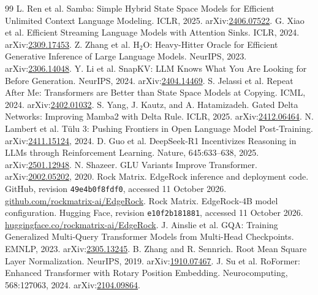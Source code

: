 \begin{thebibliography}{99}
 L. Ren et al. Samba: Simple Hybrid State Space Models for Efficient Unlimited Context Language Modeling. ICLR, 2025. arXiv:\href{https://arxiv.org/abs/2406.07522}{2406.07522}.
 G. Xiao et al. Efficient Streaming Language Models with Attention Sinks. ICLR, 2024. arXiv:\href{https://arxiv.org/abs/2309.17453}{2309.17453}.
 Z. Zhang et al. H$_2$O: Heavy-Hitter Oracle for Efficient Generative Inference of Large Language Models. NeurIPS, 2023. arXiv:\href{https://arxiv.org/abs/2306.14048}{2306.14048}.
 Y. Li et al. SnapKV: LLM Knows What You Are Looking for Before Generation. NeurIPS, 2024. arXiv:\href{https://arxiv.org/abs/2404.14469}{2404.14469}.
 S. Jelassi et al. Repeat After Me: Transformers are Better than State Space Models at Copying. ICML, 2024. arXiv:\href{https://arxiv.org/abs/2402.01032}{2402.01032}.
 S. Yang, J. Kautz, and A. Hatamizadeh. Gated Delta Networks: Improving Mamba2 with Delta Rule. ICLR, 2025. arXiv:\href{https://arxiv.org/abs/2412.06464}{2412.06464}.
 N. Lambert et al. T\"ulu 3: Pushing Frontiers in Open Language Model Post-Training. arXiv:\href{https://arxiv.org/abs/2411.15124}{2411.15124}, 2024.
 D. Guo et al. DeepSeek-R1 Incentivizes Reasoning in LLMs through Reinforcement Learning. Nature, 645:633--638, 2025. arXiv:\href{https://arxiv.org/abs/2501.12948}{2501.12948}.
 N. Shazeer. GLU Variants Improve Transformer. arXiv:\href{https://arxiv.org/abs/2002.05202}{2002.05202}, 2020.
 Rock Matrix. EdgeRock inference and deployment code. GitHub, revision \texttt{49e4b0f8fdf0}, accessed 11 October 2026. \href{https://github.com/rockmatrix-ai/EdgeRock/tree/49e4b0f8fdf0ff508f7570c6b3ef3eada3c8747a}{github.com/rockmatrix-ai/EdgeRock}.
 Rock Matrix. EdgeRock-4B model configuration. Hugging Face, revision \texttt{e10f2b181881}, accessed 11 October 2026. \href{https://huggingface.co/rockmatrix-ai/EdgeRock/blob/e10f2b1818813b45ca53a7c98d757f388368cedb/config.json}{huggingface.co/rockmatrix-ai/EdgeRock}.
 J. Ainslie et al. GQA: Training Generalized Multi-Query Transformer Models from Multi-Head Checkpoints. EMNLP, 2023. arXiv:\href{https://arxiv.org/abs/2305.13245}{2305.13245}.
 B. Zhang and R. Sennrich. Root Mean Square Layer Normalization. NeurIPS, 2019. arXiv:\href{https://arxiv.org/abs/1910.07467}{1910.07467}.
 J. Su et al. RoFormer: Enhanced Transformer with Rotary Position Embedding. Neurocomputing, 568:127063, 2024. arXiv:\href{https://arxiv.org/abs/2104.09864}{2104.09864}.

\end{thebibliography}
